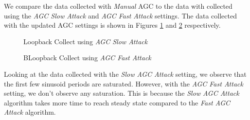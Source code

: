 \documentclass{article}
\begin{document}
We compare the data collected with \textit{Manual} AGC to the data with collected using the \textit{AGC Slow Attack} and \textit{AGC Fast Attack} settings. The data collected with the updated AGC settings is shown in Figures \ref{fig::matlab_loopback_agc_slow_attack} and \ref{fig::matlab_loopback_agc_fast_attack} respectively.

\begin{figure}[H]
	\centerline{}
	\caption{Loopback Collect using \textit{AGC Slow Attack}}
	\label{fig::matlab_loopback_agc_slow_attack}
\end{figure}

\begin{figure}[H]
	\centerline{}
	\caption{BLoopback Collect using \textit{AGC Fast Attack}}
	\label{fig::matlab_loopback_agc_fast_attack}
\end{figure}

Looking at the data collected with the \textit{Slow AGC Attack} setting, we observe that the first few sinusoid periods are saturated. However, with the \textit{AGC Fast Attack} setting, we don't observe any saturation. This is because the \textit{Slow AGC Attack} algorithm takes more time to reach steady state compared to the \textit{Fast AGC Attack} algorithm.
\end{document}
